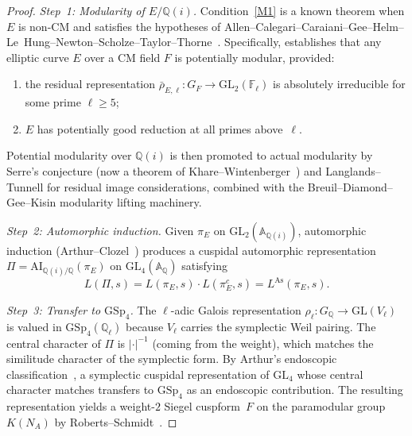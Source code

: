 \documentclass[11pt,a4paper]{article}
\newcommand{\GSp}{\mathrm{GSp}}
\newcommand{\GL}{\mathrm{GL}}
\newcommand{\Ql}{\mathbb{Q}_\ell}
\theoremstyle{definition}
\theoremstyle{remark}
\begin{document}
\begin{proof}
  \emph{Step~1: Modularity of $E/\mathbb{Q}(i)$.}
  Condition~\ref{M1} is a known theorem when $E$ is
  non-CM and satisfies the hypotheses of
  Allen--Calegari--Caraiani--Gee--Helm--Le~Hung--Newton--Scholze--Taylor--Thorne~\cite{Allen}.
  Specifically, \cite[Theorem~A]{Allen} establishes that any elliptic
  curve $E$ over a CM field $F$ is potentially modular, provided:
  \begin{enumerate}[label=(a\arabic*)]
    \item the residual representation
    $\bar{\rho}_{E,\ell}\colon G_F \to \GL_2(\mathbb{F}_\ell)$
    is absolutely irreducible for some prime $\ell \ge 5$;
    \item $E$ has potentially good reduction at all primes
    above~$\ell$.
  \end{enumerate}
  Potential modularity over $\mathbb{Q}(i)$ is then promoted
  to actual modularity by Serre's conjecture (now a theorem
  of Khare--Wintenberger~\cite{KhareWintenberger}) and
  Langlands--Tunnell for residual image considerations,
  combined with the Breuil--Diamond--Gee--Kisin
  modularity lifting machinery.

  \emph{Step~2: Automorphic induction.}
  Given $\pi_E$ on $\GL_2(\mathbb{A}_{\mathbb{Q}(i)})$,
  automorphic induction (Arthur--Clozel~\cite{ArthurClozel})
  produces a cuspidal automorphic representation
  $\Pi = \mathrm{AI}_{\mathbb{Q}(i)/\mathbb{Q}}(\pi_E)$
  on $\GL_4(\mathbb{A}_{\mathbb{Q}})$ satisfying
  \[
    L(\Pi, s) = L(\pi_E, s) \cdot L(\pi_E^c, s)
    = L^{\mathrm{As}}(\pi_E, s).
  \]

  \emph{Step~3: Transfer to $\GSp_4$.}
  The $\ell$-adic Galois representation
  $\rho_\ell\colon G_{\mathbb{Q}} \to \GL(V_\ell)$
  is valued in $\GSp_4(\Ql)$ because $V_\ell$ carries
  the symplectic Weil pairing.
  The central character of $\Pi$ is
  $|\cdot|^{-1}$ (coming from the weight), which matches
  the similitude character of the symplectic form.
  By Arthur's endoscopic classification~\cite{Arthur},
  a symplectic cuspidal representation of $\GL_4$ whose
  central character matches transfers to $\GSp_4$ as
  an endoscopic contribution.
  The resulting representation yields a weight-$2$ Siegel
  cuspform~$F$ on the paramodular group $K(N_A)$
  by Roberts--Schmidt~\cite{RobertsSchmidt}.
\end{proof}
\end{document}
